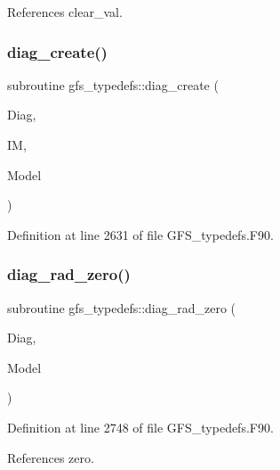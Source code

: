 References clear\+\_\+val.

\mbox{\label{namespacegfs__typedefs_a00fa46f18743cd6074b07a42af37c470}} 
\subsubsection{diag\+\_\+create()}
{\footnotesize\ttfamily subroutine gfs\+\_\+typedefs\+::diag\+\_\+create (\begin{DoxyParamCaption}\item[{class(\textbf{ gfs\+\_\+diag\+\_\+type})}]{Diag,  }\item[{integer, intent(in)}]{IM,  }\item[{type(\textbf{ gfs\+\_\+control\+\_\+type}), intent(in)}]{Model }\end{DoxyParamCaption})}



Definition at line 2631 of file G\+F\+S\+\_\+typedefs.\+F90.

\mbox{\label{namespacegfs__typedefs_aefeee1d1a5c27d9fd4ac0eab613c9c65}} 
\subsubsection{diag\+\_\+rad\+\_\+zero()}
{\footnotesize\ttfamily subroutine gfs\+\_\+typedefs\+::diag\+\_\+rad\+\_\+zero (\begin{DoxyParamCaption}\item[{class(\textbf{ gfs\+\_\+diag\+\_\+type})}]{Diag,  }\item[{type(\textbf{ gfs\+\_\+control\+\_\+type}), intent(in)}]{Model }\end{DoxyParamCaption})}



Definition at line 2748 of file G\+F\+S\+\_\+typedefs.\+F90.



References zero.

\mbox{\label{namespacegfs__typedefs_a272ea938736406d3eba81994b1c8d870}} 

